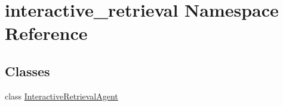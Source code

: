 \hypertarget{namespaceinteractive__retrieval}{}\section{interactive\+\_\+retrieval Namespace Reference}
\label{namespaceinteractive__retrieval}
\subsection*{Classes}
\begin{DoxyCompactItemize}
\item 
class \hyperlink{classinteractive__retrieval_1_1InteractiveRetrievalAgent}{Interactive\+Retrieval\+Agent}
\end{DoxyCompactItemize}
